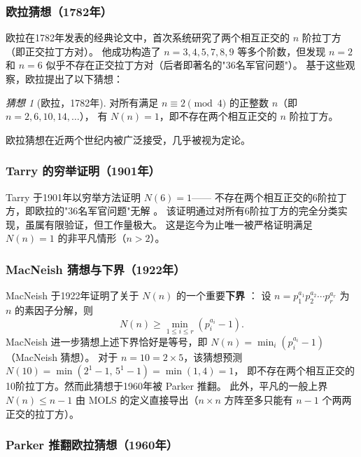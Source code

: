 \documentclass[11pt,a4paper]{ctexart}
\theoremstyle{remark}
\newtheorem{conjecture}[theorem]{猜想}
\begin{document}
\subsubsection{欧拉猜想（1782年）}

欧拉在1782年发表的经典论文中，首次系统研究了两个相互正交的 $n$ 阶拉丁方（即正交拉丁方对）\cite{euler1782}。
他成功构造了 $n = 3, 4, 5, 7, 8, 9$ 等多个阶数，但发现 $n = 2$ 和 $n = 6$
似乎不存在正交拉丁方对（后者即著名的"36名军官问题"）。
基于这些观察，欧拉提出了以下猜想：

\begin{conjecture}[欧拉，1782年]
  \label{conj:euler}
  对所有满足 $n \equiv 2 \pmod{4}$ 的正整数 $n$（即 $n = 2, 6, 10, 14, \ldots$），
  有 $N(n) = 1$，即不存在两个相互正交的 $n$ 阶拉丁方。
\end{conjecture}

欧拉猜想在近两个世纪内被广泛接受，几乎被视为定论。

\subsubsection{Tarry 的穷举证明（1901年）}

Tarry 于1901年以穷举方法证明 $N(6) = 1$——
不存在两个相互正交的6阶拉丁方，即欧拉的"36名军官问题"无解 \cite{tarry1901}。
该证明通过对所有6阶拉丁方的完全分类实现，虽属有限验证，但工作量极大。
这是迄今为止唯一被严格证明满足 $N(n) = 1$ 的非平凡情形（$n > 2$）。

\subsubsection{MacNeish 猜想与下界（1922年）}

MacNeish 于1922年证明了关于 $N(n)$ 的一个重要\textbf{下界} \cite{macneish1922}：
设 $n = p_1^{a_1} p_2^{a_2} \cdots p_r^{a_r}$ 为 $n$ 的素因子分解，则
\[
  N(n) \ge \min_{1 \le i \le r} (p_i^{a_i} - 1).
\]
MacNeish 进一步猜想上述下界恰好是等号，即 $N(n) = \min_i(p_i^{a_i}-1)$（MacNeish 猜想）。
对于 $n = 10 = 2 \times 5$，该猜想预测 $N(10) = \min(2^1-1,\, 5^1-1) = \min(1,4) = 1$，
即不存在两个相互正交的10阶拉丁方。然而此猜想于1960年被 Parker 推翻。
此外，平凡的一般上界 $N(n) \le n-1$ 由 MOLS 的定义直接导出（$n \times n$ 方阵至多只能有 $n-1$ 个两两正交的拉丁方）。

\subsubsection{Parker 推翻欧拉猜想（1960年）}
\end{document}
